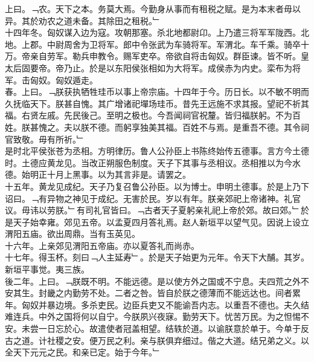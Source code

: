 \documentclass{zhvt-classic}
\begin{document}
\hspace*{2em}上曰。﹁农。天下之本。务莫大焉。今勤身从事而有租税之赋。是为本末者毋以异。其於劝农之道未备。其除田之租税。﹂\\
\hspace*{2em}十四年冬。匈奴谋入边为寇。攻朝那塞。杀北地都尉卬。上乃遣三将军军陇西。北地。上郡。中尉周舍为卫将军。郎中令张武为车骑将军。军渭北。车千乘。骑卒十万。帝亲自劳军。勒兵申教令。赐军吏卒。帝欲自将击匈奴。群臣谏。皆不听。皇太后固要帝。帝乃止。於是以东阳侯张相如为大将军。成侯赤为内史。栾布为将军。击匈奴。匈奴遁走。\\
\hspace*{2em}春。上曰。﹁朕获执牺牲珪币以事上帝宗庙。十四年于今。历日长。以不敏不明而久抚临天下。朕甚自愧。其广增诸祀墠场珪币。昔先王远施不求其报。望祀不祈其福。右贤左戚。先民後己。至明之极也。今吾闻祠官祝釐。皆归福朕躬。不为百姓。朕甚愧之。夫以朕不德。而躬享独美其福。百姓不与焉。是重吾不德。其令祠官致敬。毋有所祈。﹂\\
\hspace*{2em}是时北平侯张苍为丞相。方明律历。鲁人公孙臣上书陈终始传五德事。言方今土德时。土德应黄龙见。当改正朔服色制度。天子下其事与丞相议。丞相推以为今水德。始明正十月上黑事。以为其言非是。请罢之。\\
\hspace*{2em}十五年。黄龙见成纪。天子乃复召鲁公孙臣。以为博士。申明土德事。於是上乃下诏曰。﹁有异物之神见于成纪。无害於民。岁以有年。朕亲郊祀上帝诸神。礼官议。毋讳以劳朕。﹂有司礼官皆曰。﹁古者天子夏躬亲礼祀上帝於郊。故曰郊。﹂於是天子始幸雍。郊见五帝。以孟夏四月答礼焉。赵人新垣平以望气见。因说上设立渭阳五庙。欲出周鼎。当有玉英见。\\
\hspace*{2em}十六年。上亲郊见渭阳五帝庙。亦以夏答礼而尚赤。\\
\hspace*{2em}十七年。得玉杯。刻曰﹁人主延寿﹂。於是天子始更为元年。令天下大酺。其岁。新垣平事觉。夷三族。\\
\hspace*{2em}後二年。上曰。﹁朕既不明。不能远德。是以使方外之国或不宁息。夫四荒之外不安其生。封畿之内勤劳不处。二者之咎。皆自於朕之德薄而不能远达也。间者累年。匈奴并暴边境。多杀吏民。边臣兵吏又不能谕吾内志。以重吾不德也。夫久结难连兵。中外之国将何以自宁。今朕夙兴夜寐。勤劳天下。忧苦万民。为之怛惕不安。未尝一日忘於心。故遣使者冠盖相望。结轶於道。以谕朕意於单于。今单于反古之道。计社稷之安。便万民之利。亲与朕俱弃细过。偕之大道。结兄弟之义。以全天下元元之民。和亲已定。始于今年。﹂\\
\end{document}
